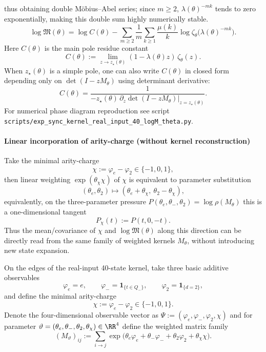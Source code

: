 thus obtaining double Möbius--Abel series; since $m\ge 2$, $\lambda(\theta)^{-mk}$ tends to zero exponentially, making this double sum highly numerically stable.
\[
\log\mathfrak{M}(\theta)
=\log C(\theta)-\sum_{m\ge 2}\frac{1}{m}\sum_{k\ge 1}\frac{\mu(k)}{k}\log\zeta_\theta\bigl(\lambda(\theta)^{-mk}\bigr).
\]
Here $C(\theta)$ is the main pole residue constant
\[
C(\theta):=\lim_{z\to z_\star(\theta)}(1-\lambda(\theta)z)\,\zeta_\theta(z).
\]
When $z_\star(\theta)$ is a simple pole, one can also write $C(\theta)$ in closed form depending only on $\det(I-zM_\theta)$ using determinant derivative:
\[
C(\theta)=\frac{1}{-z_\star(\theta)\,\partial_z\det(I-zM_\theta)\big|_{z=z_\star(\theta)}}.
\]
For numerical phase diagram reproduction see script \texttt{scripts/exp\_sync\_kernel\_real\_input\_40\_logM\_theta.py}.

\paragraph{Linear incorporation of arity-charge (without kernel reconstruction)}
Take the minimal arity-charge
\[
\chi:=\varphi_e-\varphi_2\in\{-1,0,1\},
\]
then linear weighting $\exp(\theta_\chi\chi)$ of $\chi$ is equivalent to parameter substitution
\[
(\theta_e,\theta_2)\mapsto(\theta_e+\theta_\chi,\ \theta_2-\theta_\chi),
\]
equivalently, on the three-parameter pressure $P(\theta_e,\theta_-,\theta_2)=\log\rho(M_\theta)$ this is a one-dimensional tangent
\[
P_\chi(t):=P(t,0,-t).
\]
Thus the mean/covariance of $\chi$ and $\log\mathfrak{M}(\theta)$ along this direction can be directly read from the same family of weighted kernels $M_\theta$, without introducing new state expansion.

\begin{definition}\label{def:real-input-40-observables-4d}
On the edges of the real-input 40-state kernel, take three basic additive observables
\[
\varphi_e=e,\qquad
\varphi_-=\mathbf{1}_{\{t\in Q_-\}},\qquad
\varphi_2=\mathbf{1}_{\{d=2\}},
\]
and define the minimal arity-charge
\[
\chi:=\varphi_e-\varphi_2\in\{-1,0,1\}.
\]
Denote the four-dimensional observable vector as
\(
\Psi:=(\varphi_e,\varphi_-,\varphi_2,\chi)
\)
and for parameter $\vartheta=(\theta_e,\theta_-,\theta_2,\theta_\chi)\in\RR^4$ define the weighted matrix family
\[
(M_\vartheta)_{ij}:=\sum_{i\to j}\exp\bigl(\theta_e\varphi_e+\theta_-\varphi_-+\theta_2\varphi_2+\theta_\chi\chi\bigr).
\]
\end{definition}

